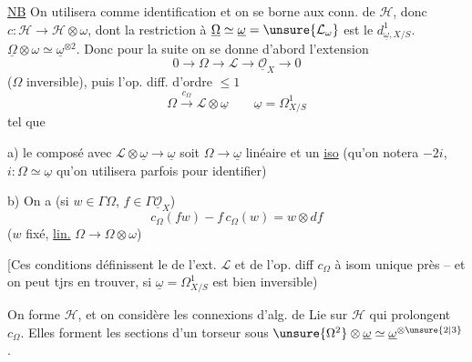 \uline{NB} On utilisera  comme identification et on se borne aux conn. de $\mathcal{H}$, donc $c:\mathcal{H}\longrightarrow\mathcal{H}\otimes\omega$, dont la restriction à $\underline{\Omega}\simeq\underline{\omega}=\unsure{\mathcal{L}_{\omega}}$ est le $d^1_{\underline{\omega},X/S}$.
    $\underline{\Omega}\otimes\omega\simeq\underline{\omega}^{\otimes2}$.
Donc pour la suite on se donne d'abord l'extension
\[
0\longrightarrow\Omega\longrightarrow\mathcal{L}\longrightarrow\underline{\mathcal{O}}_X\longrightarrow0
\]
($\Omega$ inversible), puis l'op. diff. d'ordre $\leq1$
\[
\Omega\xrightarrow{c_\Omega}\mathcal{L}\otimes\underline{\omega}\qquad\underline{\omega}=\Omega^1_{X/S}
\]
tel que

a) le composé avec $\mathcal{L}\otimes\underline{\omega}\longrightarrow\underline{\omega}$ soit  $\Omega\longrightarrow\underline{\omega}$ linéaire et un \uline{iso} (qu'on notera $-2i$, $i:\Omega\simeq\underline{\omega}$ qu'on utilisera parfois pour identifier)

b)  On a (si $w\in\Gamma\Omega$, $f\in\Gamma\underline{\mathcal{O}}_X$)
\[
c_\Omega(fw)-f\,c_\Omega(w)=w\otimes df
\]
($w$ fixé,  \uline{lin.} $\Omega\longrightarrow\Omega\otimes\omega$)

[Ces conditions définissent le  de l'ext. $\mathcal{L}$ et de l'op. diff $c_\Omega$ à isom unique près -- et on peut tjrs en trouver, si $\underline{\omega}=\Omega^1_{X/S}$ est bien inversible)

On forme $\mathcal{H}$, et on considère les connexions  d'alg. de Lie  sur $\mathcal{H}$ qui prolongent $c_\Omega$. Elles forment les sections d'un torseur sous $\unsure{\Omega^2}\otimes\underline{\omega}\simeq\underline{\omega}^{\otimes\unsure{2|3}}$. 


